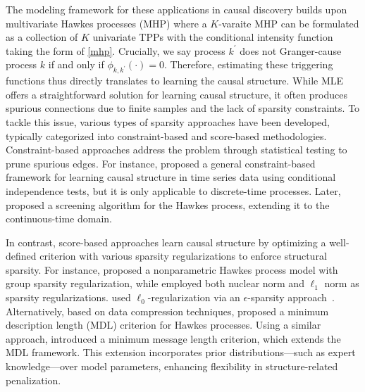 \documentclass[10pt]{article} %
\begin{document}
The modeling framework for these applications in causal discovery builds upon multivariate Hawkes processes (MHP) where a $K$-varaite MHP can be formulated as a collection of $K$ univariate TPPs with the conditional intensity function taking the form of \cref{mhp}. 
Crucially, we say process $k^\prime$ does not Granger-cause process $k$ if and only if $\phi_{k,k^\prime}(\cdot) = 0$. 
Therefore, estimating these triggering functions thus directly translates to learning the causal structure. 
While MLE offers a straightforward solution for learning causal structure, it often produces spurious connections due to finite samples and the lack of sparsity constraints. To tackle this issue, various types of sparsity approaches have been developed, typically categorized into constraint-based and score-based methodologies. 
Constraint-based approaches address the problem through statistical testing to prune spurious edges. For instance, \citet{runge2019detecting} proposed a general constraint-based framework for learning causal structure in time series data using conditional independence tests, but it is only applicable to discrete-time processes. Later, \citet{mogensen2020causal} proposed a screening algorithm for the Hawkes process, extending it to the continuous-time domain. 


In contrast, score-based approaches learn causal structure by optimizing a well-defined criterion with various sparsity regularizations to enforce structural sparsity. For instance, \citet{xu2016learning} proposed a nonparametric Hawkes process model with group sparsity regularization, while \citet{zhou2013learningsocial} employed both nuclear norm and $\ell_1$ norm as sparsity regularizations. \citet{ide2021cardinality} used $\ell_0$-regularization via an $\epsilon$-sparsity approach~\citep{phan2019}. Alternatively, based on data compression techniques, \citet{jalaldoust2022causal} proposed a minimum description length (MDL) criterion for Hawkes processes. Using a similar approach, \citet{hlavavckova2024granger} introduced a minimum message length criterion, which extends the MDL framework. This extension incorporates prior distributions—such as expert knowledge—over model parameters, enhancing flexibility in structure-related penalization. 
\end{document}
